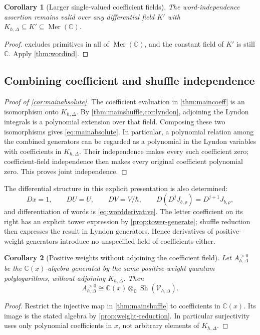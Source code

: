 \documentclass[11pt]{article}
\numberwithin{equation}{section}
\newtheorem{corollary}[corollary]{Corollary}
\theoremstyle{definition}
\theoremstyle{remark}
\newcommand{\C}{\mathbb C}
\newcommand{\Mer}{\operatorname{Mer}}
\newcommand{\Sh}{\operatorname{Sh}}
\newcommand{\calV}{\mathcal V}
\newcommand{\qh}{\hbar}
\begin{document}
\begin{corollary}[Larger single-valued coefficient fields]\label{cor:largerfield}
The word-independence assertion remains valid over any differential field
$K'$ with
$K_{\qh,\Delta}\subseteq K'\subseteq\Mer(\C)$.
\end{corollary}
\begin{proof}
 excludes primitives in all of $\Mer(\C)$, and the
constant field of $K'$ is still $\C$. Apply \cref{thm:wordind}.
\end{proof}

\subsection{Combining coefficient and shuffle independence}
\label{sec:absolute-completeness}

\begin{proof}[Proof of \cref{cor:mainabsolute}]
The coefficient evaluation in \cref{thm:maincoeff} is an isomorphism onto
$K_{\qh,\Delta}$. By \cref{thm:mainshuffle,cor:lyndon}, adjoining the Lyndon integrals is a
polynomial extension over that field. Composing these two isomorphisms gives
\eqref{eq:mainabsolute}. In particular, a polynomial relation among the
combined generators can be regarded as a polynomial in the Lyndon variables
with coefficients in $K_{\qh,\Delta}$. Their independence makes every such
coefficient zero; coefficient-field independence then makes every original
coefficient polynomial zero. This proves joint independence.
\end{proof}

The differential structure in this explicit presentation is also determined:
\[
 Dx=1,\qquad DU=U,\qquad DV=V/\qh,\qquad
 D(D^jJ_{b,\rho})=D^{j+1}J_{b,\rho},
\]
and differentiation of words is \eqref{eq:wordderivative}. The letter
coefficient on its right has an explicit tower expression by
\cref{prop:tower-generate}; shuffle reduction then expresses the result in
Lyndon generators. Hence derivatives of positive-weight generators introduce
no unspecified field of coefficients either.

\begin{corollary}[Positive weights without adjoining the coefficient field]
\label{cor:positive-absolute}
Let $A_{\qh,\Delta}^{>0}$ be the $\C(x)$-algebra generated by the same
positive-weight quantum polylogarithms, without adjoining $K_{\qh,\Delta}$.
Then
\[
 A_{\qh,\Delta}^{>0}\cong
 \C(x)\otimes_\C\Sh(\calV_{\qh,\Delta}).
\]
\end{corollary}
\begin{proof}
Restrict the injective map in \cref{thm:mainshuffle} to coefficients in
$\C(x)$. Its image is the stated algebra by
\cref{prop:weight-reduction}. In particular surjectivity uses only polynomial
coefficients in $x$, not arbitrary elements of $K_{\qh,\Delta}$.
\end{proof}
\end{document}
